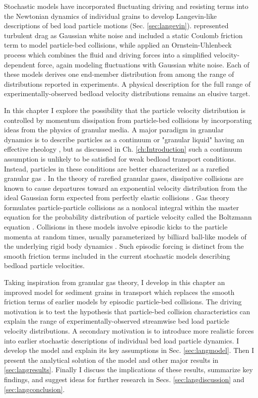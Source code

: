 Stochastic models have incorporated fluctuating driving and resisting terms into the Newtonian dynamics of individual grains to develop Langevin-like descriptions of bed load particle motions (Sec. \ref{sec:langevin}). \citet{Fan2014} represented turbulent drag as Gaussian white noise and included a static Coulomb friction term to model particle-bed collisions, while \citet{Ancey2014} applied an Ornstein-Uhlenbeck process which combines the fluid and driving forces into a simplified velocity-dependent force, again modeling fluctuations with Gaussian white noise.
Each of these models derives one end-member distribution from among the range of distributions reported in experiments.
A physical description for the full range of experimentally-observed bedload velocity distributions remains an elusive target.

In this chapter I explore the possibility that the particle velocity distribution is controlled by momentum dissipation from particle-bed collisions by incorporating ideas from the physics of granular media.
A major paradigm in granular dynamics is to describe particles as a continuum or "granular liquid" having an effective rheology \citep[e.g.][]{Jenkins1998,Andreotti2013}, but as discussed in Ch. \ref{ch:Introduction} such a continuum assumption is unlikely to be satisfied for weak bedload transport conditions. Instead, particles in these conditions are better characterized as a rarefied granular gas \citep[e.g.][]{Furbish2021}. 
In the theory of rarefied granular gases, dissipative collisions are known to cause departures toward an exponential velocity distribution from the ideal Gaussian form expected from perfectly elastic collisions \citep{Brilliantov2004}.
Gas theory formulates particle-particle collisions as a nonlocal integral within the master equation for the probability distribution of particle velocity called the Boltzmann equation \citep{Landau1969,Chapman1970,Brilliantov2004}.
Collisions in these models involve episodic kicks to the particle momenta at random times, usually parameterized by billiard ball-like models of the underlying rigid body dynamics \citep[e.g.][]{Brach1989}.
Such episodic forcing is distinct from the smooth friction terms included in the current stochastic models describing bedload particle velocities.

Taking inspiration from granular gas theory, I develop in this chapter an improved model for sediment grains in transport which replaces the smooth friction terms of earlier models by episodic particle-bed collisions.
The driving motivation is to test the hypothesis that particle-bed collision characteristics can explain the range of experimentally-observed streamwise bed load particle velocity distributions.
A secondary motivation is to introduce more realistic forces into earlier stochastic descriptions of individual bed load particle dynamics. 
I develop the model and explain its key assumptions in Sec. \ref{sec:langmodel}. Then I present the analytical solution of the model and other major results in \ref{sec:langresults}. Finally I discuss the implications of these results, summarize key findings, and suggest ideas for further research in Secs. \ref{sec:langdiscussion} and \ref{sec:langconclusion}.


